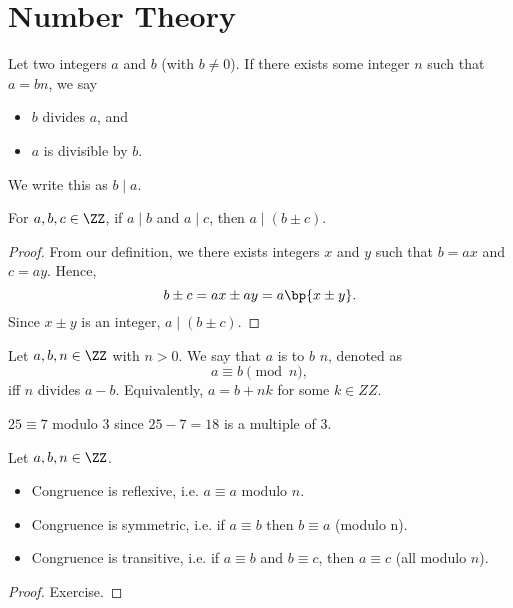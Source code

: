 \chapter{Number Theory}

\begin{definition}
    Let two integers $a$ and $b$ (with $b \neq 0$). If there exists some integer $n$ such that $a = bn$, we say
    \begin{itemize}
        \item $b$ divides $a$, and
        \item $a$ is divisible by $b$.
    \end{itemize}
    We write this as $b \mid a$.
\end{definition}

\begin{proposition}
    For $a, b, c \in \ZZ$, if $a \mid b$ and $a \mid c$, then $a \mid (b \pm c)$.
\end{proposition}
\begin{proof}
    From our definition, we there exists integers $x$ and $y$ such that $b = ax$ and $c = ay$. Hence, \[b \pm c = ax \pm ay = a\bp{x \pm y}.\] Since $x \pm y$ is an integer, $a \mid (b \pm c)$.
\end{proof}

\begin{definition}
    Let $a, b, n \in \ZZ$ with $n > 0$. We say that $a$ is  to $b$  $n$, denoted as \[a \equiv b \pmod{n},\] iff $n$ divides $a - b$. Equivalently, $a = b + nk$ for some $k \in ZZ$.
\end{definition}

\begin{example}
    $25 \equiv 7$ modulo 3 since $25 - 7 = 18$ is a multiple of 3.
\end{example}

\begin{proposition}
    Let $a, b, n \in \ZZ$.
    \begin{itemize}
        \item Congruence is reflexive, i.e. $a \equiv a$ modulo $n$.
        \item Congruence is symmetric, i.e. if $a \equiv b$ then $b \equiv a$ (modulo n).
        \item Congruence is transitive, i.e. if $a \equiv b$ and $b \equiv c$, then $a \equiv c$ (all modulo $n$).
    \end{itemize}
\end{proposition}
\begin{proof}
    Exercise.
\end{proof}

